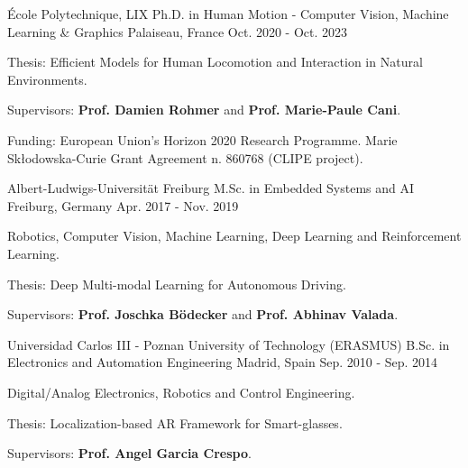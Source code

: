 

\begin{cventries}

  \cventry
    {École Polytechnique, LIX} %
    {Ph.D. in Human Motion - Computer Vision, Machine Learning \& Graphics} %
    {Palaiseau, France} %
    {Oct. 2020 - Oct. 2023} %
    {
      \begin{cvitems} %
        \item {Thesis: Efficient Models for Human Locomotion and Interaction in Natural Environments.}
        \item {Supervisors: \textbf{Prof. Damien Rohmer} and \textbf{Prof. Marie-Paule Cani}.}
        \item {Funding: European Union’s Horizon 2020 Research Programme. Marie Skłodowska-Curie Grant Agreement n. 860768 (CLIPE project).}
      \end{cvitems}
    }

  \vspace{0.5cm}
  \cventry
    {Albert-Ludwigs-Universität Freiburg} %
    {M.Sc. in Embedded Systems and AI} %
    {Freiburg, Germany} %
    {Apr. 2017 - Nov. 2019} %
    {
      \begin{cvitems} %
        \item {Robotics, Computer Vision, Machine Learning, Deep Learning and Reinforcement Learning.}
        \item {Thesis: Deep Multi-modal Learning for Autonomous Driving.}
        \item {Supervisors: \textbf{Prof. Joschka Bödecker} and \textbf{Prof. Abhinav Valada}.}
      \end{cvitems}
    }

  \vspace{0.5cm}
  \cventry
    {Universidad Carlos III - Poznan University of Technology (ERASMUS)} %
    {B.Sc. in Electronics and Automation Engineering} %
    {Madrid, Spain} %
    {Sep. 2010 - Sep. 2014} %
    {
      \begin{cvitems} %
        \item {Digital/Analog Electronics, Robotics and Control Engineering.}
        \item {Thesis: Localization-based AR Framework for Smart-glasses.}
        \item {Supervisors: \textbf{Prof. Angel Garcia Crespo}.}
      \end{cvitems}
    }

\end{cventries}

